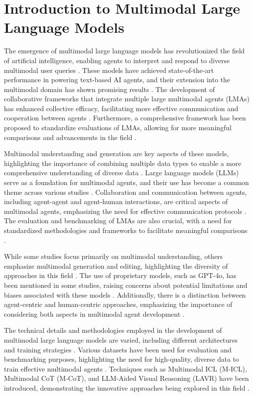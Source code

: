 \documentclass[conference]{IEEEtran}
\begin{document}
\section{Introduction to Multimodal Large Language Models}
The emergence of multimodal large language models has revolutionized the field of artificial intelligence, enabling agents to interpret and respond to diverse multimodal user queries \cite{b1}. These models have achieved state-of-the-art performance in powering text-based AI agents, and their extension into the multimodal domain has shown promising results \cite{b2}. The development of collaborative frameworks that integrate multiple large multimodal agents (LMAs) has enhanced collective efficacy, facilitating more effective communication and cooperation between agents \cite{b3}. Furthermore, a comprehensive framework has been proposed to standardize evaluations of LMAs, allowing for more meaningful comparisons and advancements in the field \cite{b4}.

Multimodal understanding and generation are key aspects of these models, highlighting the importance of combining multiple data types to enable a more comprehensive understanding of diverse data \cite{b5}. Large language models (LLMs) serve as a foundation for multimodal agents, and their use has become a common theme across various studies \cite{b6}. Collaboration and communication between agents, including agent-agent and agent-human interactions, are critical aspects of multimodal agents, emphasizing the need for effective communication protocols \cite{b7}. The evaluation and benchmarking of LMAs are also crucial, with a need for standardized methodologies and frameworks to facilitate meaningful comparisons \cite{b8}.

While some studies focus primarily on multimodal understanding, others emphasize multimodal generation and editing, highlighting the diversity of approaches in this field \cite{b9}. The use of proprietary models, such as GPT-4o, has been mentioned in some studies, raising concerns about potential limitations and biases associated with these models \cite{b10}. Additionally, there is a distinction between agent-centric and human-centric approaches, emphasizing the importance of considering both aspects in multimodal agent development \cite{b11}.

The technical details and methodologies employed in the development of multimodal large language models are varied, including different architectures and training strategies \cite{b12}. Various datasets have been used for evaluation and benchmarking purposes, highlighting the need for high-quality, diverse data to train effective multimodal agents \cite{b13}. Techniques such as Multimodal ICL (M-ICL), Multimodal CoT (M-CoT), and LLM-Aided Visual Reasoning (LAVR) have been introduced, demonstrating the innovative approaches being explored in this field \cite{b14}.
\end{document}
